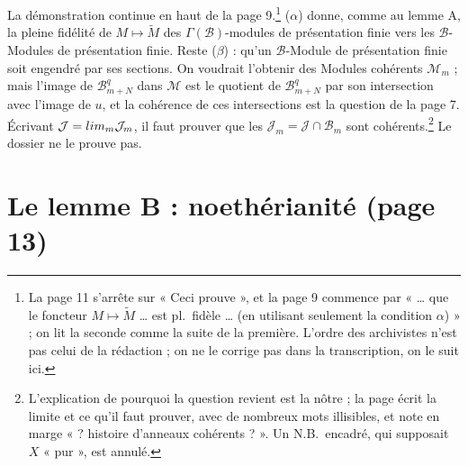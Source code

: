 \documentclass[11pt,a4paper]{article}
\begin{document}
La démonstration continue en haut de la page 9.\footnote{La page 11 s'arrête
sur « Ceci prouve », et la page 9 commence par « … que le foncteur
$M \mapsto \widetilde{M}$ … est pl.\ fidèle … (en utilisant seulement la
condition $\alpha$) » ; on lit la seconde comme la suite de la première.
L'ordre des archivistes n'est pas celui de la rédaction ; on ne le corrige pas
dans la transcription, on le suit ici.} ($\alpha$) donne, comme au lemme A, la
pleine fidélité de $M \mapsto \widetilde{M}$ des $\Gamma(\mathcal{B})$-modules
de présentation finie vers les $\mathcal{B}$-Modules de présentation finie.
Reste ($\beta$) : qu'un $\mathcal{B}$-Module de présentation finie soit
engendré par ses sections. On voudrait l'obtenir des Modules cohérents
$\mathcal{M}_{m}$ ; mais l'image de $\mathcal{B}_{m+N}^{q}$ dans $\mathcal{M}$
est le quotient de $\mathcal{B}_{m+N}^{q}$ par son intersection avec l'image
de $u$, et la cohérence de ces intersections est la question de la page 7.
Écrivant $\mathcal{J} = \varinjlim_{m} \mathcal{J}_{m}$, il faut prouver que
les $\mathcal{J}_{m} = \mathcal{J} \cap \mathcal{B}_{m}$ sont
cohérents.\footnote{L'explication de pourquoi la question revient est la
nôtre ; la page écrit la limite et ce qu'il faut prouver, avec de nombreux
mots illisibles, et note en marge « ? histoire d'anneaux cohérents ? ». Un
N.B.\ encadré, qui supposait $X$ « pur », est annulé.} Le dossier ne le
prouve pas.

\section*{Le lemme B : noethérianité (page 13)}
\end{document}
